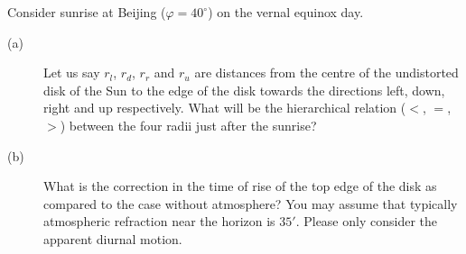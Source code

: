 Consider sunrise at Beijing ($\varphi = 40^\circ$) on the vernal equinox day.

\begin{description}
\item[(a)] Let us say $r_l$, $r_d$, $r_r$ and $r_u$ are distances from the
  centre of the undistorted disk of the Sun to the edge of the disk towards the
  directions left, down, right and up respectively. What will be the
  hierarchical relation ($<$, $=$, $>$) between the four radii just after the
  sunrise?
\item[(b)] What is the correction in the time of rise of the top edge of the
  disk as compared to the case without atmosphere? You may assume that
  typically atmospheric refraction near the horizon is $35'$. Please only
  consider the apparent diurnal motion.
\end{description}
